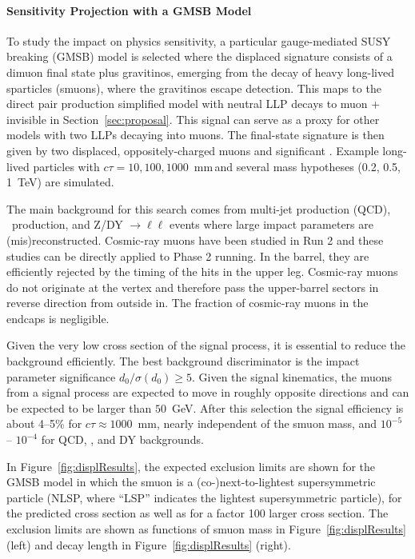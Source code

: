 \paragraph{Sensitivity Projection with a GMSB Model}

To study the impact on physics sensitivity, a particular gauge-mediated SUSY breaking (GMSB) model is selected where the displaced signature consists of a dimuon final state plus gravitinos, emerging from the decay of heavy long-lived sparticles (smuons), where the gravitinos escape detection. This maps to the direct pair production simplified model with neutral LLP decays to muon + invisible in Section~\ref{sec:proposal}. This signal can serve as a proxy for other models with two LLPs decaying into muons. The final-state signature is then given by two displaced, oppositely-charged muons and significant \met. Example long-lived particles with $c\tau=10, 100, 1000$~mm\,and several mass hypotheses (0.2, 0.5, 1~TeV) are simulated.

The main background for this search comes from multi-jet production (QCD), \ttbar~production, and Z/DY $\to\ell\ell$ events where large impact parameters are (mis)reconstructed. Cosmic-ray muons have been studied in Run 2 and these studies can be directly applied to Phase 2 running. 
In the barrel, they are efficiently rejected by the timing of the hits in the upper leg. Cosmic-ray muons do not originate at the vertex and therefore pass the upper-barrel sectors in reverse direction from outside in. The fraction of cosmic-ray muons in the endcaps is negligible.

Given the very low cross section of the signal process, it is essential to reduce the background efficiently. The best background discriminator is the impact parameter significance $d_0 / \sigma (d_0) \geq 5$. Given the signal kinematics, the muons from a signal process are expected to move in roughly opposite directions and \met can be expected to be larger than $50$~GeV. After this selection the signal efficiency is about 4--5\% for $c\tau \approx 1000$~mm, nearly independent of the smuon mass, and $10^{-5}$ -- $10^{-4}$ for QCD, \ttbar, and DY backgrounds.

In Figure~\ref{fig:displResults}, the expected exclusion limits are shown for the GMSB model in which the smuon is a (co-)next-to-lightest supersymmetric particle (NLSP, where ``LSP'' indicates the lightest supersymmetric particle), for the predicted cross section as well as for a factor 100 larger cross section. The exclusion limits are shown as functions of smuon mass in Figure~\ref{fig:displResults} (left) and decay length in Figure~\ref{fig:displResults} (right).

